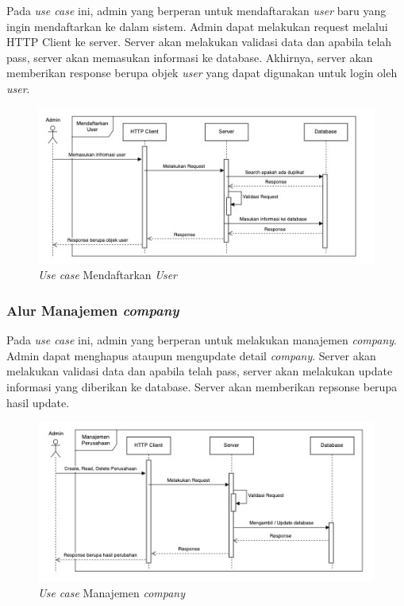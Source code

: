 Pada \textit{use case} ini, admin yang berperan untuk mendaftarakan \textit{user} baru yang ingin mendaftarkan ke dalam sistem. Admin dapat melakukan request melalui HTTP Client ke server. Server akan melakukan validasi data dan apabila telah pass, server akan memasukan informasi ke database. Akhirnya, server akan memberikan response berupa objek \textit{user} yang dapat digunakan untuk login oleh \textit{user}.

\begin{figure}[h]
  \centering
  \includegraphics[width=1\textwidth]{resources/chapter-3/usecase/uc-02.jpg}
  \caption{\textit{Use case} Mendaftarkan \textit{User}}
  \label{fig:usecase-02}
\end{figure}

\subsubsection{Alur Manajemen \textit{company}}

Pada \textit{use case} ini, admin yang berperan untuk melakukan manajemen \textit{company}. Admin dapat menghapus ataupun mengupdate detail \textit{company}. Server akan melakukan validasi data dan apabila telah pass, server akan melakukan update informasi yang diberikan ke database. Server akan memberikan repsonse berupa hasil update.

\begin{figure}
  \centering
  \includegraphics[width=1\textwidth]{resources/chapter-3/usecase/uc-03.jpg}
  \caption{\textit{Use case} Manajemen \textit{company}}
  \label{fig:usecase-03}
\end{figure}

